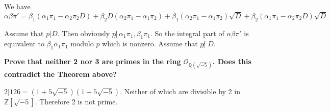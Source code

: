 \documentclass[letterpaper, 12pt]{article}
\begin{document}
    We have $$\alpha\beta\pi' = \beta_1(\alpha_1\pi_1-\alpha_2\pi_2D)+\beta_2D(\alpha_2\pi_1-\alpha_1\pi_2) + \beta_1(\alpha_2\pi_1-\alpha_1\pi_2)\sqrt{D}+\beta_2(\alpha_1\pi_1-\alpha_2\pi_2D)\sqrt{D}$$
    
    Assume that $p | D$. Then obviously $p\not|\,\alpha_1\pi_1,\beta_1\pi_1$. So the integral part of $\alpha\beta\pi'$ is equivalent to $\beta_1\alpha_1\pi_1$ modulo $p$ which is nonzero. Assume that $p \not|\; D$.
    
%            
%                
%            
%            
%            

\textbf{Prove that neither 2 nor 3 are primes in the ring $\mathcal{O}_{\mathbb{Q}(\sqrt{-5})}$.  Does this contradict the Theorem above?}

    $2 | 126 = (1+5\sqrt{-5})(1-5\sqrt{-5})$. Neither of which are divisible by 2 in $\mathbb{Z}[\sqrt{-5}]$. Therefore 2 is not prime.
    
\end{document}
